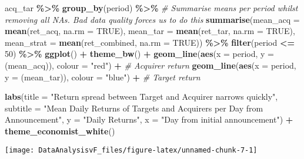 \documentclass[
]{article}
\newenvironment{Shaded}{\begin{snugshade}}{\end{snugshade}}
\newcommand{\CommentTok}[1]{\textcolor[rgb]{0.56,0.35,0.01}{\textit{#1}}}
\newcommand{\DataTypeTok}[1]{\textcolor[rgb]{0.13,0.29,0.53}{#1}}
\newcommand{\DecValTok}[1]{\textcolor[rgb]{0.00,0.00,0.81}{#1}}
\newcommand{\KeywordTok}[1]{\textcolor[rgb]{0.13,0.29,0.53}{\textbf{#1}}}
\newcommand{\NormalTok}[1]{#1}
\newcommand{\OperatorTok}[1]{\textcolor[rgb]{0.81,0.36,0.00}{\textbf{#1}}}
\newcommand{\OtherTok}[1]{\textcolor[rgb]{0.56,0.35,0.01}{#1}}
\newcommand{\StringTok}[1]{\textcolor[rgb]{0.31,0.60,0.02}{#1}}
\begin{document}
\begin{Shaded}
\begin{Highlighting}[]
\NormalTok{acq\_tar }\OperatorTok{\%\textgreater{}\%}
\StringTok{  }\KeywordTok{group\_by}\NormalTok{(period) }\OperatorTok{\%\textgreater{}\%}
\StringTok{  }\CommentTok{\# Summarise means per period whilst removing all NAs. Bad data quality forces us to do this}
\StringTok{  }\KeywordTok{summarise}\NormalTok{(}\DataTypeTok{mean\_acq =} \KeywordTok{mean}\NormalTok{(ret\_acq, }\DataTypeTok{na.rm =} \OtherTok{TRUE}\NormalTok{),}
            \DataTypeTok{mean\_tar =} \KeywordTok{mean}\NormalTok{(ret\_tar, }\DataTypeTok{na.rm =} \OtherTok{TRUE}\NormalTok{),}
            \DataTypeTok{mean\_strat =} \KeywordTok{mean}\NormalTok{(ret\_combined, }\DataTypeTok{na.rm =} \OtherTok{TRUE}\NormalTok{)) }\OperatorTok{\%\textgreater{}\%}
\StringTok{  }\KeywordTok{filter}\NormalTok{(period }\OperatorTok{\textless{}=}\StringTok{ }\DecValTok{50}\NormalTok{) }\OperatorTok{\%\textgreater{}\%}
\StringTok{  }\KeywordTok{ggplot}\NormalTok{() }\OperatorTok{+}
\StringTok{  }\KeywordTok{theme\_bw}\NormalTok{() }\OperatorTok{+}
\StringTok{  }\KeywordTok{geom\_line}\NormalTok{(}\KeywordTok{aes}\NormalTok{(}\DataTypeTok{x =}\NormalTok{ period, }\DataTypeTok{y =}\NormalTok{ (mean\_acq)), }\DataTypeTok{colour =} \StringTok{"red"}\NormalTok{) }\OperatorTok{+}\StringTok{ }\CommentTok{\# Acquirer return}
\StringTok{  }\KeywordTok{geom\_line}\NormalTok{(}\KeywordTok{aes}\NormalTok{(}\DataTypeTok{x =}\NormalTok{ period, }\DataTypeTok{y =}\NormalTok{ (mean\_tar)), }\DataTypeTok{colour =} \StringTok{"blue"}\NormalTok{) }\OperatorTok{+}\StringTok{ }\CommentTok{\# Target return}

\StringTok{  }\KeywordTok{labs}\NormalTok{(}\DataTypeTok{title =} \StringTok{"Return spread between Target and Acquirer narrows quickly"}\NormalTok{,}
       \DataTypeTok{subtitle =} \StringTok{"Mean Daily Returns of Targets and Acquirers per Day from Announcement"}\NormalTok{,}
       \DataTypeTok{y =} \StringTok{"Daily Returns"}\NormalTok{,}
       \DataTypeTok{x =} \StringTok{"Day from initial announcement"}\NormalTok{) }\OperatorTok{+}\StringTok{ }
\StringTok{  }\KeywordTok{theme\_economist\_white}\NormalTok{()}
\end{Highlighting}
\end{Shaded}

\begin{center}\texttt{[image: DataAnalysisvF\_files/figure-latex/unnamed-chunk-7-1]} \end{center}
\end{document}
